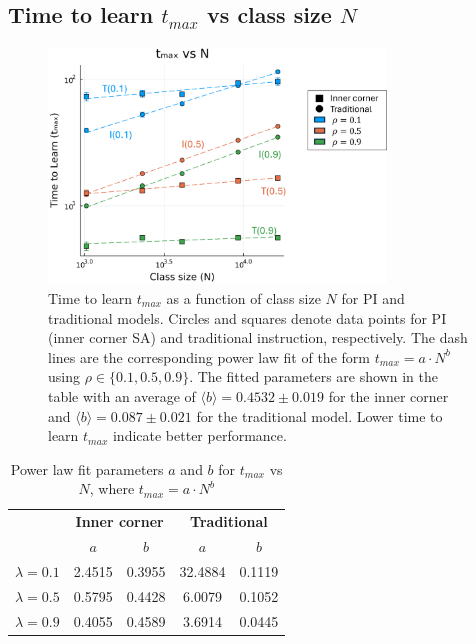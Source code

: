 \newpage

\subsection{Time to learn $t_{max}$ vs class size $N$} \label{subsec: 2DBPCA tmax vs N}
\begin{figure}[h!]
    \centering
    \includegraphics[width=0.8\textwidth]{figures/2D-BPCA-analysis/N_vs_tmax-traditional-inner_corner.png}
    \caption[Class size dependence of time to learn in homogenous models]{Time to learn $t_{max}$ as a function of class size $N$ for PI and traditional models. 
    Circles and squares denote data points for PI (inner corner SA) and traditional instruction, respectively. 
    The dash lines are the corresponding power law fit of the form $t_{max}=a \cdot N^b$ using $\rho \in \lbrace 0.1, 0.5, 0.9 \rbrace$. 
    The fitted parameters are shown in the table with an average of $\langle b \rangle = 0.4532 \pm 0.019$ for the inner corner and $\langle b \rangle = 0.087\pm0.021$ for the traditional model.
    Lower time to learn $t_{max}$ indicate better performance.
    }
    \label{fig:Traditional vs PI tmax vs N}
\end{figure}

\begin{table}[htbp!]
  \centering
  
  \begin{tabular}{|c|cc|cc|}
    \hline
    & \multicolumn{2}{c|}{\textbf{Inner corner}}       & \multicolumn{2}{c|}{\textbf{Traditional}}        \\ \cline{2-5} 
    & \multicolumn{1}{c|}{\textbf{$a$}} & \textbf{$b$} & \multicolumn{1}{c|}{\textbf{$a$}} & \textbf{$b$} \\ \hline
    \textbf{$\lambda=0.1$} & \multicolumn{1}{c|}{2.4515}       & 0.3955       & \multicolumn{1}{c|}{32.4884}      & 0.1119       \\ \hline
    \textbf{$\lambda=0.5$} & \multicolumn{1}{c|}{0.5795}       & 0.4428       & \multicolumn{1}{c|}{6.0079}       & 0.1052       \\ \hline
    \textbf{$\lambda=0.9$} & \multicolumn{1}{c|}{0.4055}       & 0.4589       & \multicolumn{1}{c|}{3.6914}       & 0.0445       \\ \hline
  \end{tabular}
  \caption{Power law fit parameters $a$ and $b$ for $t_{max}$ vs $N$, where $t_{max}=a \cdot N ^ b$}
  \label{tab:2DBPCA tmax vs N fit params}
\end{table}

